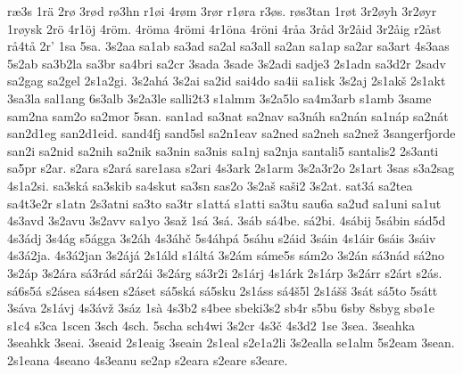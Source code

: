 {    ræ3s
    1rä
    2rø
    3rød
    rø3hn
    r1øi
    4røm
    3rør
    r1øra
    r3øs.
    røs3tan
    1røt
    3r2øyh
    3r2øyr
    1røysk
    2rö
    4r1öj
    4röm.
    4röma
    4römi
    4r1öna
    4röni
    4råa
    3råd
    3r2åid
    3r2åig
    r2åst
    rå4tå
    2r'
    1sa
    5sa.
    3s2aa
    sa1ab
    sa3ad
    sa2al
    sa3all
    sa2an
    sa1ap
    sa2ar
    sa3art
    4s3aas
    5s2ab
    sa3b2la
    sa3br
    sa4bri
    sa2cr
    3sada
    3sade
    3s2adi
    sadje3
    2s1adn
    sa3d2r
    2sadv
    sa2gag
    sa2gel
    2s1a2gi.
    3s2ahá
    3s2ai
    sa2id
    sai4do
    sa4ii
    sa1isk
    3s2aj
    2s1akš
    2s1akt
    3sa3la
    sal1ang
    6s3alb
    3s2a3le
    salli2t3
    s1almm
    3s2a5lo
    sa4m3arb
    s1amb
    3same
    sam2na
    sam2o
    sa2mor
    5san.
    san1ad
    sa3nat
    sa2nav
    sa3náh
    sa2nán
    sa1náp
    sa2nát
    san2d1eg
    san2d1eid.
    sand4fj
    sand5sl
    sa2n1eav
    sa2ned
    sa2neh
    sa2než
    3sangerfjorde
    san2i
    sa2nid
    sa2nih
    sa2nik
    sa3nin
    sa3nis
    sa1nj
    sa2nja
    santali5
    santalis2
    2s3anti
    sa5pr
    s2ar.
    s2ara
    s2ará
    sare1asa
    s2ari
    4s3ark
    2s1arm
    3s2a3r2o
    2s1art
    3sas
    s3a2sag
    4s1a2si.
    sa3ská
    sa3skib
    sa4skut
    sa3sn
    sas2o
    3s2aš
    saši2
    3s2at.
    sat3á
    sa2tea
    sa4t3e2r
    s1atn
    2s3atni
    sa3to
    sa3tr
    s1attá
    s1atti
    sa3tu
    sau6a
    sa2uđ
    sa1uni
    sa1ut
    4s3avd
    3s2avu
    3s2avv
    sa1yo
    3saž
    1sá
    3sá.
    3sáb
    sá4be.
    sá2bi.
    4sábij
    5sábin
    sád5d
    4s3ádj
    3s4ág
    s5ágga
    3s2áh
    4s3áhč
    5s4áhpá
    5sáhu
    s2áid
    3sáin
    4s1áir
    6sáis
    3sáiv
    4s3á2ja.
    4s3á2jan
    3s2ájá
    2s1áld
    s1áltá
    3s2ám
    sáme5s
    sám2o
    3s2án
    sá3nád
    sá2no
    3s2áp
    3s2ára
    sá3rád
    sár2ái
    3s2árg
    sá3r2i
    2s1árj
    4s1árk
    2s1árp
    3s2árr
    s2árt
    s2ás.
    sá6s5á
    s2ásea
    sá4sen
    s2áset
    sá5ská
    sá5sku
    2s1áss
    sá4š5l
    2s1ášš
    3sát
    sá5to
    5sátt
    3sáva
    2s1ávj
    4s3ávž
    3sáz
    1sà
    4s3b2
    s4bee
    sbeki3s2
    sb4r
    s5bu
    6sby
    8sbyg
    sbø1e
    s1c4
    s3ca
    1scen
    3sch
    4sch.
    5scha
    sch4wi
    3s2cr
    4s3č
    4s3d2
    1se
    3sea.
    3seahka
    3seahkk
    3seai.
    3seaid
    2s1eaig
    3seain
    2s1eal
    s2e1a2li
    3s2ealla
    se1alm
    5s2eam
    3sean.
    2s1eana
    4seano
    4s3eanu
    se2ap
    s2eara
    s2eare
    s3eare.
}
